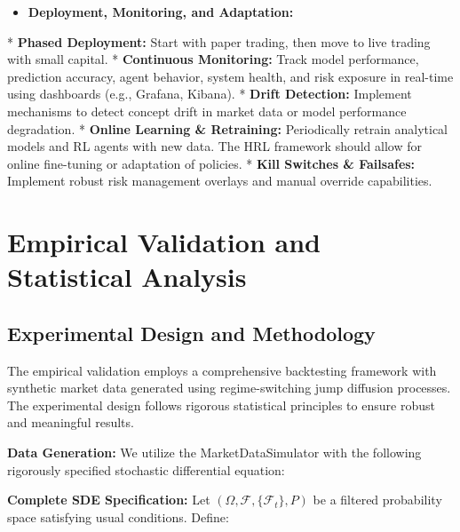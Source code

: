 \documentclass[11pt,a4paper]{article}
\begin{document}
\begin{itemize}
\item   \textbf{Deployment, Monitoring, and Adaptation:}
\end{itemize}
    *   \textbf{Phased Deployment:} Start with paper trading, then move to live trading with small capital.
    *   \textbf{Continuous Monitoring:} Track model performance, prediction accuracy, agent behavior, system health, and risk exposure in real-time using dashboards (e.g., Grafana, Kibana).
    *   \textbf{Drift Detection:} Implement mechanisms to detect concept drift in market data or model performance degradation.
    *   \textbf{Online Learning \& Retraining:} Periodically retrain analytical models and RL agents with new data. The HRL framework should allow for online fine-tuning or adaptation of policies.
    *   \textbf{Kill Switches \& Failsafes:} Implement robust risk management overlays and manual override capabilities.

\section{Empirical Validation and Statistical Analysis}

\subsection{Experimental Design and Methodology}

The empirical validation employs a comprehensive backtesting framework with synthetic market data generated using regime-switching jump diffusion processes. The experimental design follows rigorous statistical principles to ensure robust and meaningful results.

\textbf{Data Generation:} We utilize the MarketDataSimulator with the following rigorously specified stochastic differential equation:

\textbf{Complete SDE Specification:}
Let $(\Omega, \mathcal{F}, \{\mathcal{F}_t\}, P)$ be a filtered probability space satisfying usual conditions. Define:
\end{document}
